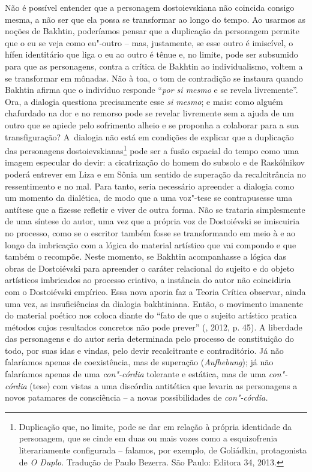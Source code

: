 {{Não é possível entender que a personagem dostoievskiana não coincida
consigo mesma, a não ser que ela possa se transformar ao longo do tempo.
Ao usarmos as noções de Bakhtin, poderíamos pensar que a duplicação da
personagem permite que o eu se veja como eu"-outro -- mas, justamente, se
esse outro é imiscível, o hífen identitário que liga o eu ao outro é
tênue e, no limite, pode ser subsumido para que as personagens, contra a
crítica de Bakhtin ao individualismo, voltem a se transformar em
mônadas. Não à toa, o tom de contradição se instaura quando Bakhtin
afirma que o indivíduo responde ``\emph{por si mesmo} e se revela
livremente''. Ora, a dialogia questiona precisamente esse \emph{si
mesmo}; e mais: como alguém chafurdado na dor e no remorso pode se
revelar livremente sem a ajuda de um outro que se apiede pelo sofrimento
alheio e se proponha a colaborar para a sua transfiguração? A~dialogia
não está em condições de explicar que a duplicação das personagens
dostoievskianas\footnote{Duplicação que, no limite, pode se dar em
  relação à própria identidade da personagem, que se cinde em duas ou
  mais vozes como a esquizofrenia literariamente configurada -- falamos,
  por exemplo, de Goliádkin, protagonista de \emph{O Duplo}. Tradução de
  Paulo Bezerra. São Paulo: Editora 34, 2013.} pode ser a fusão espacial
do tempo como uma imagem especular do devir: a cicatrização do homem do
subsolo e de Raskólnikov poderá entrever em Liza e em Sônia um sentido
de superação da recalcitrância no ressentimento e no mal. Para tanto,
seria necessário apreender a dialogia como um momento da dialética, de
modo que a uma voz"-tese se contrapusesse uma antítese que a fizesse
refletir e viver de outra forma. Não se trataria simplesmente de uma
síntese do autor, uma vez que a própria voz de Dostoiévski se imiscuiria
no processo, como se o escritor também fosse se transformando em meio à
e ao longo da imbricação com a lógica do material artístico que vai
compondo e que também o recompõe. Neste momento, se Bakhtin acompanhasse
a lógica das obras de Dostoiévski para apreender o caráter relacional do
sujeito e do objeto artísticos imbricados ao processo criativo, a
instância do autor não coincidiria com o Dostoiévski empírico. Essa nova
aporia faz a Teoria Crítica observar, ainda uma vez, as insuficiências
da dialogia bakhtiniana. Então, o movimento imanente do material poético
nos coloca diante do ``fato de que o sujeito artístico pratica métodos
cujos resultados concretos não pode prever'' (, 2012, p. 45). A
liberdade das personagens e do autor seria determinada pelo processo de
constituição do todo, por suas idas e vindas, pelo devir recalcitrante e
contraditório. Já não falaríamos apenas de coexistência, mas de
superação (\emph{Aufhebung}); já não falaríamos apenas de uma
\emph{con"-córdia} tolerante e estática, mas de uma \emph{con"-córdia}
(tese) com vistas a uma discórdia antitética que levaria as personagens
a novos patamares de consciência -- a novas possibilidades de
\emph{con"-córdia.}

}}
